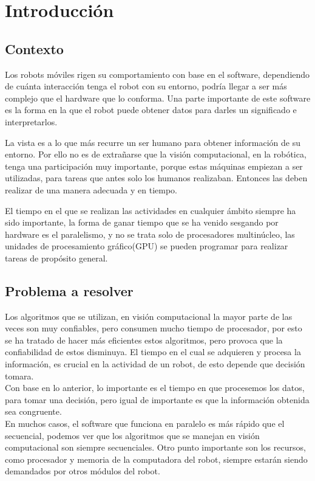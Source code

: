 \chapter{Introducción}

\section{Contexto}
Los robots móviles rigen su comportamiento con base en el software, dependiendo de cuánta interacción tenga el robot con su entorno, podría llegar a ser más complejo que el hardware que lo conforma. Una parte importante de este software es la forma en la que el robot puede obtener datos para darles un significado e interpretarlos. 

La vista es a lo que más recurre un ser humano para obtener información de su entorno. Por ello no es de extrañarse que la visión computacional, en la robótica, tenga una participación muy importante, porque estas máquinas empiezan a ser utilizadas, para tareas que antes solo los humanos realizaban. Entonces las deben realizar de una manera adecuada y en tiempo. 

El tiempo en el que se realizan las actividades en cualquier ámbito siempre ha sido importante, la forma de ganar tiempo que se ha venido sesgando por hardware es el paralelismo, y no se trata solo de procesadores multinúcleo, las unidades de procesamiento gráfico(GPU) se pueden programar para realizar tareas de propósito general.   

\section{Problema a resolver}
Los algoritmos que se utilizan, en visión computacional la mayor parte de las veces son muy confiables, pero consumen mucho tiempo de procesador, por esto se ha tratado de hacer más eficientes estos algoritmos, pero provoca que  la confiabilidad de estos disminuya. El tiempo en el cual se adquieren y procesa la información, es crucial en la actividad de un robot, de esto depende que decisión tomara.\\

Con base en lo anterior, lo importante es el tiempo en que procesemos los datos, para tomar una decisión, pero igual de importante es que la información obtenida sea congruente. \\

En muchos casos, el software que funciona en paralelo es más rápido que el secuencial, podemos ver que los algoritmos que se manejan en visión computacional son siempre secuenciales. Otro punto importante son los recursos, como procesador y memoria de la computadora del robot, siempre estarán siendo demandados por otros módulos del robot.    \\

